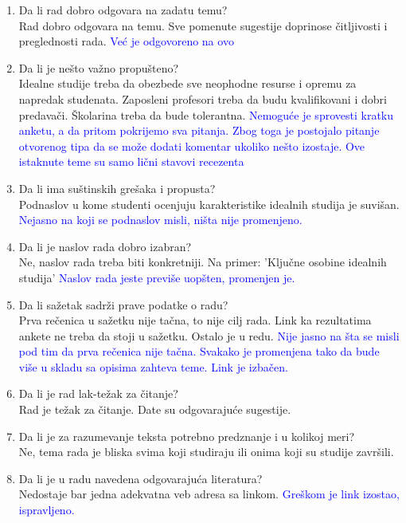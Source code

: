 \documentclass[a4paper]{report}
\newcommand{\odgovor}[1]{\textcolor{blue}{#1}}
\begin{document}
 \begin{enumerate}
 \item Da li rad dobro odgovara na zadatu temu?\\
 Rad dobro odgovara na temu. Sve pomenute sugestije doprinose čitljivosti i preglednosti rada.
 \odgovor{Već je odgovoreno na ovo}
 
 \item Da li je nešto važno propušteno?\\
 Idealne studije treba da obezbede sve neophodne resurse i opremu za napredak studenata. Zaposleni profesori treba da budu kvalifikovani i dobri predavači. Školarina treba da bude tolerantna.
 \odgovor{Nemoguće je sprovesti kratku anketu, a da pritom pokrijemo sva pitanja. Zbog toga je postojalo pitanje otvorenog tipa da se može dodati komentar ukoliko nešto izostaje. Ove istaknute teme su samo lični stavovi recezenta}
 
 \item Da li ima suštinskih grešaka i propusta?\\
 Podnaslov u kome studenti ocenjuju karakteristike idealnih studija je suvišan.
 \odgovor{Nejasno na koji se podnaslov misli, ništa nije promenjeno.}
 
 
 \item Da li je naslov rada dobro izabran?\\
 Ne, naslov rada treba biti konkretniji. Na primer: 'Ključne osobine idealnih studija'
 \odgovor{Naslov rada jeste previše uopšten, promenjen je.}
 
 \item Da li sažetak sadrži prave podatke o radu?\\
 Prva rečenica u sažetku nije tačna, to nije cilj rada. Link ka rezultatima ankete ne treba da stoji u sažetku. Ostalo je u redu.
 \odgovor{Nije jasno na šta se misli pod tim da prva rečenica nije tačna. Svakako je promenjena tako da bude više u skladu sa opisima zahteva teme. Link je izbačen.}
 
 \item Da li je rad lak-težak za čitanje?\\
 Rad je težak za čitanje. Date su odgovarajuće sugestije.
 
 
 \item Da li je za razumevanje teksta potrebno predznanje i u kolikoj meri?\\
 Ne, tema rada je bliska svima koji studiraju ili onima koji su studije završili.
 
 
 \item Da li je u radu navedena odgovarajuća literatura?\\
 Nedostaje bar jedna adekvatna veb adresa sa linkom.
 \odgovor{Greškom je link izostao, ispravljeno.}
 

\end{enumerate}
\end{document}
